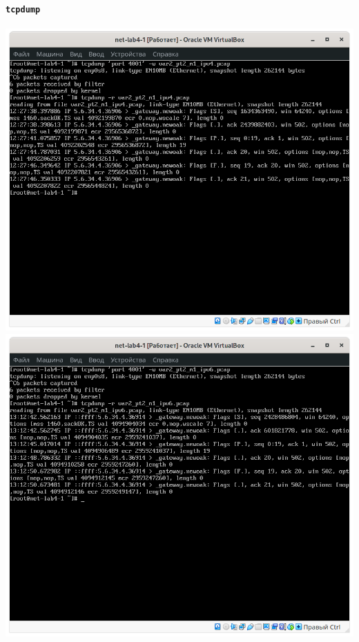 \paragraph{\texttt{tcpdump}}
\begin{center}
    \includegraphics[width=.49\textwidth]{screenshots/var2-tcpdump2-ipv4}
    \includegraphics[width=.49\textwidth]{screenshots/var2-tcpdump2-ipv6}
\end{center}

